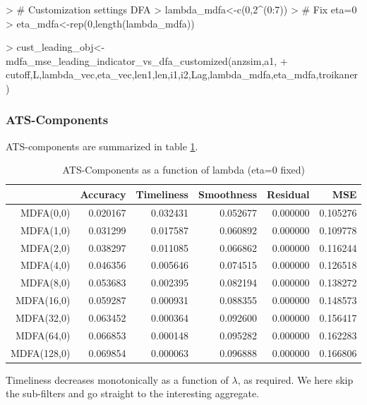 \documentclass[a4paper]{book}
\begin{document}
\begin{Schunk}
\begin{Sinput}
> # Customization settings DFA
> lambda_mdfa<-c(0,2^(0:7))
> # Fix eta=0
> eta_mdfa<-rep(0,length(lambda_mdfa))
\end{Sinput}
\end{Schunk}
\begin{Schunk}
\begin{Sinput}
> cust_leading_obj<-mdfa_mse_leading_indicator_vs_dfa_customized(anzsim,a1,
+     cutoff,L,lambda_vec,eta_vec,len1,len,i1,i2,Lag,lambda_mdfa,eta_mdfa,troikaner)  
\end{Sinput}
\end{Schunk}



\subsubsection{ATS-Components}

ATS-components are summarized in table \ref{ats_comp_mdfa_T}.
\begin{table}[ht]
\centering
\begin{tabular}{rrrrrr}
  \hline
 & Accuracy & Timeliness & Smoothness & Residual & MSE \\ 
  \hline
MDFA(0,0) & 0.020167 & 0.032431 & 0.052677 & 0.000000 & 0.105276 \\ 
  MDFA(1,0) & 0.031299 & 0.017587 & 0.060892 & 0.000000 & 0.109778 \\ 
  MDFA(2,0) & 0.038297 & 0.011085 & 0.066862 & 0.000000 & 0.116244 \\ 
  MDFA(4,0) & 0.046356 & 0.005646 & 0.074515 & 0.000000 & 0.126518 \\ 
  MDFA(8,0) & 0.053683 & 0.002395 & 0.082194 & 0.000000 & 0.138272 \\ 
  MDFA(16,0) & 0.059287 & 0.000931 & 0.088355 & 0.000000 & 0.148573 \\ 
  MDFA(32,0) & 0.063452 & 0.000364 & 0.092600 & 0.000000 & 0.156417 \\ 
  MDFA(64,0) & 0.066853 & 0.000148 & 0.095282 & 0.000000 & 0.162283 \\ 
  MDFA(128,0) & 0.069854 & 0.000063 & 0.096888 & 0.000000 & 0.166806 \\ 
   \hline
\end{tabular}
\caption{ATS-Components as a function of lambda (eta=0 fixed)} 
\label{ats_comp_mdfa_T}
\end{table}Timeliness decreases  monotonically as a function of $\lambda$, as required. We here skip the sub-filters and go straight to the interesting aggregate.
\end{document}

